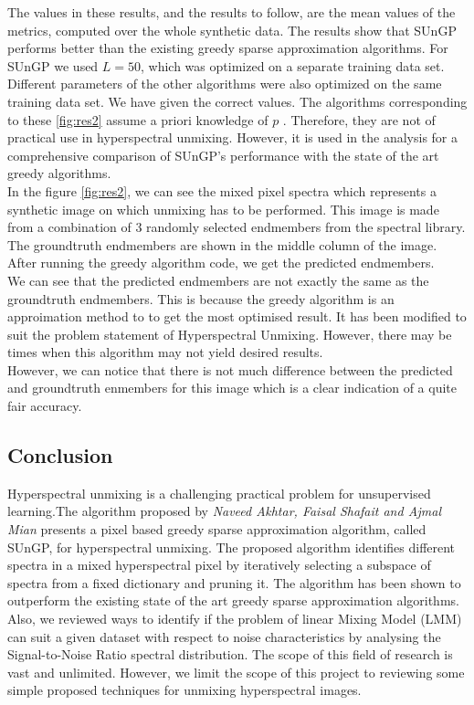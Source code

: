\documentclass[12pt]{svproc}
\begin{document}
The  values  in  these  results,  and  the  results  to  follow,  are
the  mean  values  of  the  metrics,  computed  over  the  whole
synthetic  data.  The  results  show  that  SUnGP  performs  better
than  the  existing  greedy  sparse  approximation  algorithms.
For  SUnGP  we  used $L=  50$,  which  was  optimized  on  a
separate  training  data  set.  Different  parameters  of  the  other
algorithms were also optimized on the same training data set.
We have given the correct values. The  algorithms  corresponding  to  these \ref{fig:res2} assume  a  priori  knowledge  of $p$
.  Therefore,  they  are  not  of practical  use  in  hyperspectral  unmixing.  However, it is used in the analysis for a comprehensive comparison
of  SUnGP’s  performance  with  the  state  of  the  art  greedy
algorithms.\\

In the figure \ref{fig:res2}, we can see the mixed pixel spectra which represents a synthetic image on which unmixing has to be performed. This image is made from a combination of 3 randomly selected endmembers from the spectral library. The groundtruth endmembers are shown in the middle column of the image. After running the greedy algorithm code, we get the predicted endmembers. \\

We can see that the predicted endmembers are not exactly the same as the groundtruth endmembers. This is because the greedy algorithm is an approimation method to to get the most optimised result. It has been modified to suit the problem statement of Hyperspectral Unmixing.  However, there may be times when this algorithm may not yield desired results.\\

However, we can notice that there is not much difference between the predicted and groundtruth enmembers for this image which is a clear indication of a quite fair accuracy. 





\subsection{Conclusion}


Hyperspectral unmixing is a challenging practical problem for unsupervised learning.The algorithm proposed by \emph{Naveed Akhtar, Faisal Shafait and Ajmal Mian} presents a pixel based greedy sparse approximation algorithm, called SUnGP, for hyperspectral unmixing. The proposed algorithm identifies different spectra in a mixed hyperspectral pixel by iteratively selecting a subspace of spectra from a fixed dictionary and pruning it. The algorithm has been shown to
outperform the existing state of the art greedy sparse approximation algorithms. Also, we reviewed ways to identify if the problem of linear Mixing Model (LMM) can suit a given dataset with respect to noise characteristics by analysing the Signal-to-Noise Ratio spectral distribution. 
The scope of this field of research is vast and unlimited. However, we limit the scope of this project to reviewing some simple proposed techniques for unmixing hyperspectral images.
\end{document}
